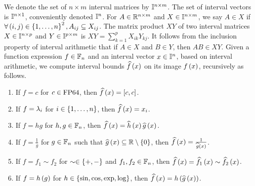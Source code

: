 We denote the set of $n\times m$ interval matrices by $\mathbb{I}^{n\times m}$.
The set of interval vectors is $\mathbb{I}^{n\times 1}$, conveniently
denoted $\mathbb{I}^{n}$.  For $A\in\mathbb{R}^{n\times m}$ and
$X\in\mathbb{I}^{n\times m}$, we say $A\in X$ if
$\forall \left(i,j\right)\in\left\{1,\ldots,n\right\}^2, A_{ij}\subseteq X_{ij}$.  The
matrix product $XY$ of two interval matrices $X\in\mathbb{I}^{n\times
p}$ and $Y\in\mathbb{I}^{p\times m}$ is $XY
= \sum_{k=1}^pX_{ik}Y_{kj}$.  It follows from the inclusion property
of interval arithmetic that if $A\in X$ and $B\in Y$, then $AB\in XY$.
Given a function expression $f\in\mathbb{F}_{n}$ and an interval vector
$x\in\mathbb{I}^n$, based on interval arithmetic, we compute interval
bounds $\widehat{f}\left(x\right)$ on its image $f\left(x\right)$, recursively as follows.
%
\begin{enumerate}
\item If $f = c$ for $c\in\operatorname{FP64}$, then $\widehat{f}\left(x\right) = [c,c]$.
\item If $f = \lambda_{i}$ for $i\in\left\{1,\ldots,n\right\}$, then $\widehat{f}\left(x\right) =
x_i$.
\item If $f = hg$ for $h,g\in\mathbb{F}_{n}$, then $\widehat{f}\left(x\right)
= \widehat{h}\left(x\right)\widehat{g}\left(x\right)$.
\item If $f = \frac{1}{g}$ for $g\in\mathbb{F}_{n}$ such that
$\widehat{g}\left(x\right)\subseteq\mathbb{R}\setminus \left\{0\right\}$, then $\widehat{f}\left(x\right)
= \frac{1}{\widehat{g}\left(x\right)}$.
\item If $f = f_1\sim f_2$ for $\sim\in\left\{+,-\right\}$ and
$f_1,f_2\in\mathbb{F}_{n}$, then $\widehat{f}\left(x\right) = \widehat{f_1}\left(x\right)\sim\widehat{f_2}\left(x\right)$.
\item If $f = h\left(g\right)$ for $h\in\left\{\sin, \cos, \exp, \log\right\}$, then
$\widehat{f}\left(x\right) = h\left(\widehat{g}\left(x\right)\right)$.
\end{enumerate}
%


